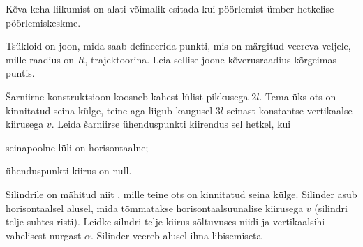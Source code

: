 \documentclass[a4paper,11pt,twocolumn]{article}
\begin{document}
Kõva keha liikumist on alati võimalik esitada kui pöörlemist ümber hetkelise pöörlemiskeskme.
\begin{question}
	Tsükloid on joon, mida saab defineerida punkti, mis on märgitud veereva veljele, mille raadius on $ R $, trajektoorina. Leia sellise joone kõverusraadius kõrgeimas puntis.
\end{question}
\begin{question}[kin7][5cm]
	Šarniirne konstruktsioon koosneb kahest lülist pikkusega $ 2l $. Tema üks ots on kinnitatud seina külge, teine aga liigub kaugusel $ 3l $ seinast konstantse vertikaalse kiirusega $ v $. Leida šarniirse ühenduspunkti kiirendus sel hetkel, kui 
	\begin{subquestion}
		\item seinapoolne lüli on horisontaalne;
		\item ühenduspunkti kiirus on null.
	\end{subquestion}
\end{question}
\vspace{1em}
\begin{question}[kin8][6cm]
	Silindrile on mähitud niit , mille teine ots on kinnitatud seina külge. Silinder asub horisontaalsel alusel, mida tõmmatakse horisontaalsuunalise kiirusega $ v $ (silindri telje suhtes risti). Leidke silndri telje kiirus sõltuvuses niidi ja vertikaalsihi vahelisest nurgast $ \alpha $. Silinder veereb alusel ilma libisemiseta
\end{question}
\end{document}
